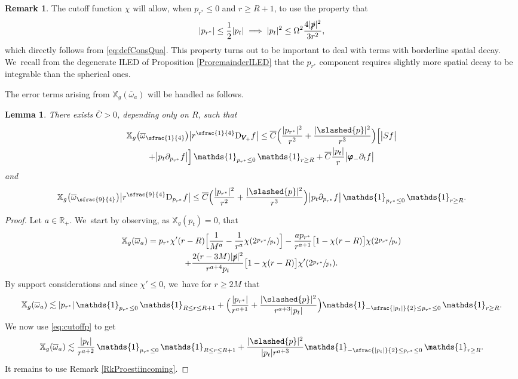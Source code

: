 \documentclass[10pt]{amsart}
\theoremstyle{plain}
\newtheorem{lemma}[proposition]{Lemma}
\theoremstyle{definition}
\newtheorem{remark}[proposition]{Remark}
\newcommand\R{{\mathbb{R}}}
\newcommand\T{{\mathbb{X}}}
\begin{document}
\begin{remark}
The cutoff function $\chi$ will allow, when $p_{r^*}\leq 0$ and $r \geq R+1$, to use the property that
\begin{equation}\label{eq:cutoffp}
|p_{r^*}| \leq \frac{1}{2}|p_t| \implies |p_t|^2 \leq \Omega^2\frac{4|\slashed{p}|^2}{3r^2},
\end{equation}
which directly follows from \eqref{eq:defConsQua}. This property turns out to be important to deal with terms with borderline spatial decay. We~recall from the degenerate ILED of Proposition \ref{ProremainderILED} that the $p_{r^*}$ component requires slightly more spatial decay to be integrable than the spherical ones.
\end{remark}
The error terms arising from $\T_g(\overline{\omega}_a)$ will be handled as follows.
\begin{lemma}\label{Lemerrorterm1}
There exists $\overline{C}>0$, depending only on $R$, such that
\begin{multline*}
\T_g \bigl(\overline{\omega}_{\sfrac{1}{4}} \bigr) \big| r^{\sfrac{1}{4}} \mathrm{D}_{\pmb{V}_{\! +}} f \big| \leq \overline{C}\Bigl(\frac{|p_{r^*}|^2}{r^2 }+ \frac{|\slashed{p}|^2}{r^3 } \Bigr) \Bigl[\big|Sf \big|
\\+ \big|p_t \partial_{p_{r^*}} f\big| \Bigr] \, \mathds{1}_{p_{r^*} \leq 0} \, \mathds{1}_{r \geq R}
+\overline{C}\frac{|p_t|}{r}\big| \pmb{\varphi}_- \partial_t f \big|
\end{multline*}
and
\[
\T_g \bigl(\overline{\omega}_{\sfrac{9}{4}} \bigr) \big|r^{\sfrac{9}{4}} \mathrm{D}_{p_{r^*}} f \big| \leq \overline{C} \Bigl(\frac{|p_{r^*}|^2}{r^2 }+ \frac{|\slashed{p}|^2}{r^3 } \Bigr) \big| p_t \partial_{p_{r^*}} f \big| \, \mathds{1}_{p_{r^*} \leq 0} \, \mathds{1}_{r \geq R}.
\]
\end{lemma}
\begin{proof}
Let $a \in \R_+$. We~start by observing, as $\T_g (p_t)=0$, that
\begin{multline*}
\T_g(\overline{\omega}_a) = p_{r^*} \chi' (r-R) \Bigl[\frac{1}{M^a}-\frac{1}{r^a}\chi(2\sfrac{p_{r^*}}{p_t}) \Bigr]- \frac{ap_{r^*}}{r^{a+1}}\bigl[ 1-\chi(r-R) \bigr] \chi(2\sfrac{p_{r^*}}{p_t}) \\
+ \frac{2(r-3M)|\slashed{p}|^2}{r^{a+4}p_t}\bigl[ 1-\chi(r-R) \bigr] \chi'(2\sfrac{p_{r^*}}{p_t}).
\end{multline*}
By support considerations and since $\chi' \leq 0$, we~have for $r \geq 2M$ that
\[
\T_g(\overline{\omega}_a) \lesssim |p_{r^*}| \,\mathds{1}_{p_{r^*} \leq 0} \, \mathds{1}_{R \leq r \leq R+1}+ \Bigl(\frac{|p_{r^*}|}{r^{a+1}} + \frac{|\slashed{p}|^2}{r^{a+3}|p_t|} \Bigr) \mathds{1}_{-\sfrac{|p_t|}{2} \leq p_{r^*} \leq 0} \, \mathds{1}_{r \geq R}.
\]
We now use \eqref{eq:cutoffp} to get
\begin{equation}\label{equation:unan}
\T_g(\overline{\omega}_a) \lesssim \frac{|p_t|}{r^{a+2}} \,\mathds{1}_{p_{r^*} \leq 0} \, \mathds{1}_{R \leq r \leq R+1}+ \frac{|\slashed{p}|^2}{|p_t|r^{a+3}} \mathds{1}_{-\sfrac{|p_t|}{2} \leq p_{r^*} \leq 0} \, \mathds{1}_{r \geq R}.
\end{equation}
It remains to use Remark \ref{RkProestiincoming}.
\end{proof}
\end{document}
